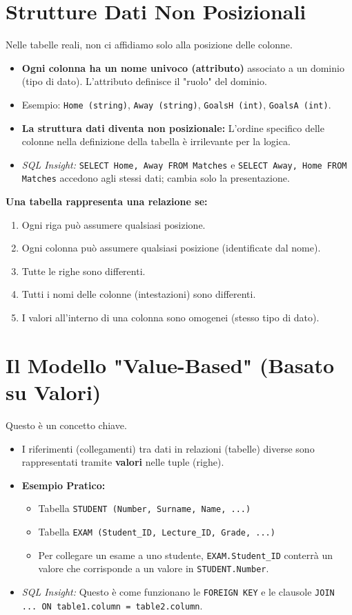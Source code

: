 \section{Strutture Dati Non Posizionali}
Nelle tabelle reali, non ci affidiamo solo alla posizione delle colonne.
\begin{itemize}
	\item \textbf{Ogni colonna ha un nome univoco (attributo)} associato a un dominio (tipo di dato). L'attributo definisce il "ruolo" del dominio.
	\item Esempio: \texttt{Home (string)}, \texttt{Away (string)}, \texttt{GoalsH (int)}, \texttt{GoalsA (int)}.
	\item \textbf{La struttura dati diventa non posizionale:} L'ordine specifico delle colonne nella definizione della tabella è irrilevante per la logica.
	\item \textit{SQL Insight:} \texttt{SELECT Home, Away FROM Matches} e \texttt{SELECT Away, Home FROM Matches} accedono agli stessi dati; cambia solo la presentazione.
\end{itemize}

\textbf{Una tabella rappresenta una relazione se:}
\begin{enumerate}
	\item Ogni riga può assumere qualsiasi posizione.
	\item Ogni colonna può assumere qualsiasi posizione (identificate dal nome).
	\item Tutte le righe sono differenti.
	\item Tutti i nomi delle colonne (intestazioni) sono differenti.
	\item I valori all'interno di una colonna sono omogenei (stesso tipo di dato).
\end{enumerate}

\section{Il Modello "Value-Based" (Basato su Valori)}
Questo è un concetto chiave.
\begin{itemize}
	\item I riferimenti (collegamenti) tra dati in relazioni (tabelle) diverse sono rappresentati tramite \textbf{valori} nelle tuple (righe).
	\item \textbf{Esempio Pratico:}
	\begin{itemize}
		\item Tabella \texttt{STUDENT (Number, Surname, Name, ...)}
		\item Tabella \texttt{EXAM (Student\_ID, Lecture\_ID, Grade, ...)}
		\item Per collegare un esame a uno studente, \texttt{EXAM.Student\_ID} conterrà un valore che corrisponde a un valore in \texttt{STUDENT.Number}.
	\end{itemize}
	\item \textit{SQL Insight:} Questo è come funzionano le \texttt{FOREIGN KEY} e le clausole \texttt{JOIN ... ON table1.column = table2.column}.
\end{itemize}

